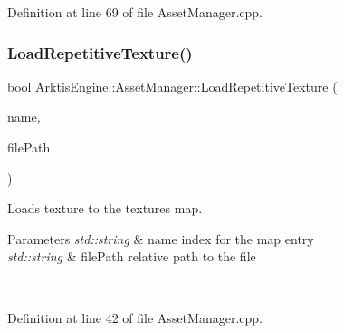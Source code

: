Definition at line 69 of file Asset\+Manager.\+cpp.


\begin{DoxyCode}{0}

\end{DoxyCode}
\mbox{\label{class_arktis_engine_1_1_asset_manager_adf4904f82f595623f8e40134a7a9d398}} 
\subsubsection{\texorpdfstring{LoadRepetitiveTexture()}{LoadRepetitiveTexture()}}
{\footnotesize\ttfamily bool Arktis\+Engine\+::\+Asset\+Manager\+::\+Load\+Repetitive\+Texture (\begin{DoxyParamCaption}\item[{std\+::string}]{name,  }\item[{std\+::string}]{file\+Path }\end{DoxyParamCaption})}



Loads texture to the textures map. 


\begin{DoxyParams}{Parameters}
{\em std\+::string} & name index for the map entry\\
\hline
{\em std\+::string} & file\+Path relative path to the file \begin{DoxyVerb}\end{DoxyVerb}
 \\
\hline
\end{DoxyParams}


Definition at line 42 of file Asset\+Manager.\+cpp.


